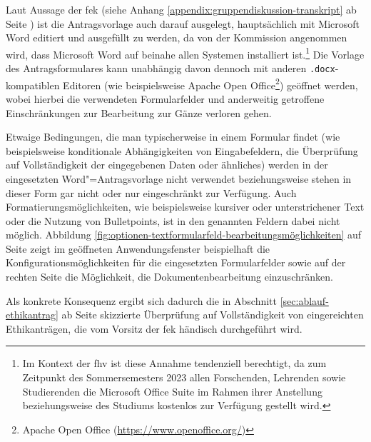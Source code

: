 \documentclass[a4paper,12pt,twoside]{scrreprt}
\begin{document}
Laut Aussage der \acl{fek} (siehe Anhang \ref{appendix:gruppendiskussion-transkript} ab Seite \pageref{appendix:gruppendiskussion-transkript}) ist die Antragsvorlage auch darauf ausgelegt, hauptsächlich mit Microsoft Word editiert und ausgefüllt zu werden, da von der Kommission angenommen wird, dass Microsoft Word auf beinahe allen Systemen installiert ist.\footnote{Im Kontext der \acl{fhv} ist diese Annahme tendenziell berechtigt, da zum Zeitpunkt des Sommersemesters 2023 allen Forschenden, Lehrenden sowie Studierenden die Microsoft Office Suite im Rahmen ihrer Anstellung beziehungsweise des Studiums kostenlos zur Verfügung gestellt wird.} Die Vorlage des Antragsformulares kann unabhängig davon dennoch mit anderen \texttt{.docx}-kompatiblen Editoren (wie beispielsweise Apache Open Office\footnote{Apache Open Office (\url{https://www.openoffice.org/})}) geöffnet werden, wobei hierbei die verwendeten Formularfelder und anderweitig getroffene Einschränkungen zur Bearbeitung zur Gänze verloren gehen.

Etwaige Bedingungen, die man typischerweise in einem Formular findet (wie beispielsweise konditionale Abhängigkeiten von Eingabefeldern, die Überprüfung auf Vollständigkeit der eingegebenen Daten oder ähnliches) werden in der eingesetzten Word"=Antragsvorlage nicht verwendet beziehungsweise stehen in dieser Form gar nicht oder nur eingeschränkt zur Verfügung. Auch Formatierungsmöglichkeiten, wie beispielsweise kursiver oder unterstrichener Text oder die Nutzung von Bulletpoints, ist in den genannten Feldern dabei nicht möglich.
Abbildung \ref{fig:optionen-textformularfeld-bearbeitungsmöglichkeiten} auf Seite \pageref{fig:optionen-textformularfeld-bearbeitungsmöglichkeiten} zeigt im geöffneten Anwendungsfenster beispielhaft die Konfigurationsmöglichkeiten für die eingesetzten Formularfelder sowie auf der rechten Seite die Möglichkeit, die Dokumentenbearbeitung einzuschränken.

Als konkrete Konsequenz ergibt sich dadurch die in Abschnitt \ref{sec:ablauf-ethikantrag} ab Seite \pageref{sec:ablauf-ethikantrag} skizzierte Überprüfung auf Vollständigkeit von eingereichten Ethikanträgen, die vom Vorsitz der \ac{fek} händisch durchgeführt wird.
\end{document}
